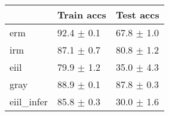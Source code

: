 \begin{tabular}{lll}
\toprule
{} &      Train accs &       Test accs \\
\midrule
erm        &  92.4 $\pm$ 0.1 &  67.8 $\pm$ 1.0 \\
irm        &  87.1 $\pm$ 0.7 &  80.8 $\pm$ 1.2 \\
eiil       &  79.9 $\pm$ 1.2 &  35.0 $\pm$ 4.3 \\
gray       &  88.9 $\pm$ 0.1 &  87.8 $\pm$ 0.3 \\
eiil_infer &  85.8 $\pm$ 0.3 &  30.0 $\pm$ 1.6 \\
\bottomrule
\end{tabular}

